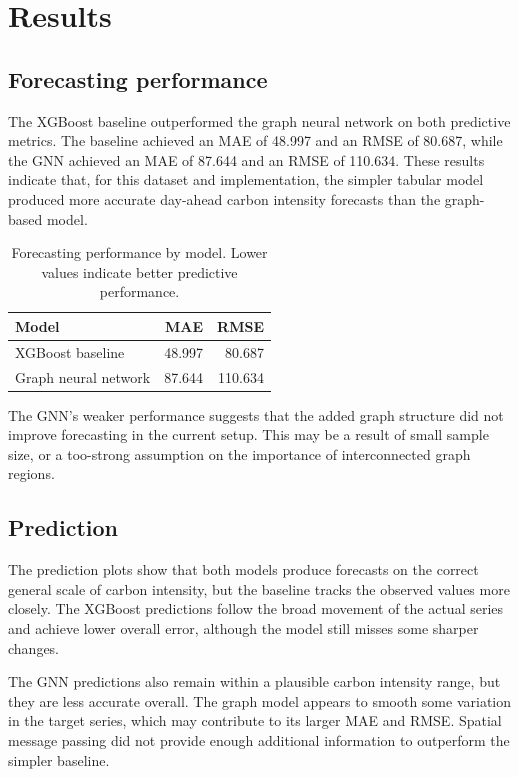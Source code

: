 \documentclass{article}
\begin{document}
\section{Results}

\subsection{Forecasting performance}

The XGBoost baseline outperformed the graph neural network on both predictive metrics. The baseline achieved an MAE of 48.997 and an RMSE of 80.687, while the GNN achieved an MAE of 87.644 and an RMSE of 110.634. These results indicate that, for this dataset and implementation, the simpler tabular model produced more accurate day-ahead carbon intensity forecasts than the graph-based model.

\begin{table}[h]
  \centering
  \caption{Forecasting performance by model. Lower values indicate better predictive performance.}
  \label{tab:forecasting-performance}
  \begin{tabular}{lrr}
    \toprule
    Model & MAE & RMSE \\
    \midrule
    XGBoost baseline & 48.997 & 80.687 \\
    Graph neural network & 87.644 & 110.634 \\
    \bottomrule
  \end{tabular}
\end{table}

The GNN's weaker performance suggests that the added graph structure did not improve forecasting in the current setup. This may be a result of small sample size, or a too-strong assumption on the importance of interconnected graph regions. 

\subsection{Prediction}

The prediction plots show that both models produce forecasts on the correct general scale of carbon intensity, but the baseline tracks the observed values more closely. The XGBoost predictions follow the broad movement of the actual series and achieve lower overall error, although the model still misses some sharper changes.

The GNN predictions also remain within a plausible carbon intensity range, but they are less accurate overall. The graph model appears to smooth some variation in the target series, which may contribute to its larger MAE and RMSE. Spatial message passing did not provide enough additional information to outperform the simpler baseline.
\end{document}
